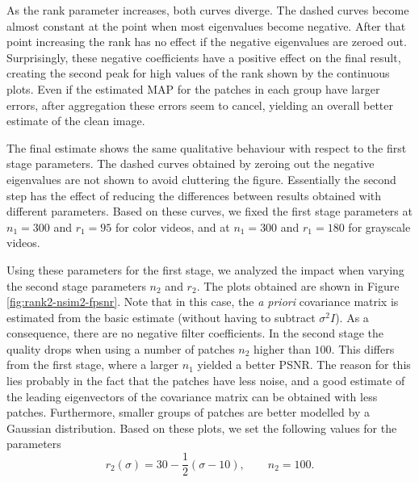 \documentclass[10pt, journal, twocolumn, final, a4paper]{IEEEtran}
\newcommand{\pcomment}[1]{}
\begin{document}
{As the rank parameter increases, both curves diverge. 
The dashed curves become almost constant at the point when
most eigenvalues become negative. After that point increasing the
rank has no effect if the negative eigenvalues are zeroed out.
%
Surprisingly, these negative coefficients have a positive effect on the final 
result, creating the second peak for high values of the rank shown by the
continuous plots.
Even if the estimated MAP for the
patches in each group have larger errors, after aggregation these errors seem
to cancel, yielding an overall better estimate of the clean image.}

{The final estimate shows the same qualitative behaviour with respect to the first
stage parameters. The dashed curves obtained by zeroing out the negative
eigenvalues are not shown to avoid cluttering the figure. Essentially the
second step has the effect of reducing the differences between results obtained
with different parameters. Based on these curves, we fixed the first stage parameters at
$n_1 = 300$ and $r_1 = 95$ for color videos, and at $n_1 = 300$ and $r_1 = 180$ for grayscale videos.}

Using these parameters for the first stage, we analyzed the impact when varying the second stage
parameters $n_2$ and $r_2$. The plots obtained are shown in Figure
\ref{fig:rank2-nsim2-fpsnr}.
%
Note that in this case, the \emph{a
priori} covariance matrix is estimated from the basic estimate (without having
to subtract $\sigma^2I$). As a consequence, there are no negative filter coefficients.
%
In the second stage the quality drops when
using a number of patches $n_2$ higher than $100$. This differs from the first stage,
where a larger $n_1$ yielded a better PSNR.
The reason for this lies probably in the fact that the patches have less noise,
and a good estimate of the leading eigenvectors of the covariance matrix can be obtained
with less patches. Furthermore, smaller groups of patches
are better modelled by a Gaussian distribution.
Based on these plots, we set the following values for the parameters
\[r_2(\sigma) = 30 - \frac12(\sigma - 10),\quad\quad n_{2} = 100.\]
\end{document}
